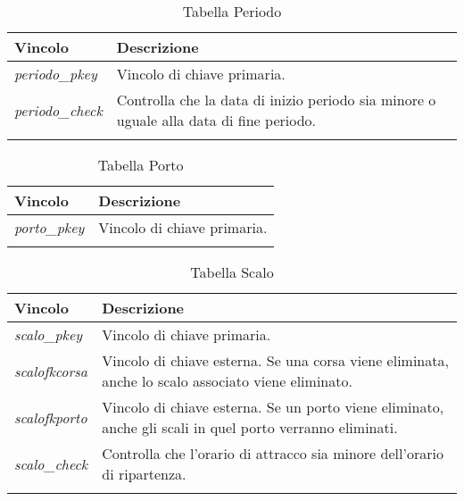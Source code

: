 \begin{longtable}{|| m{} | m{} ||}
    \hline\hline
     \textbf{Vincolo} & \textbf{Descrizione} \\ [1ex]
     \hline\hline
     \endfirsthead

      \textit{periodo\_pkey} & Vincolo di chiave primaria. \\ [1ex]
      \hline

      \textit{periodo\_check} & Controlla che la data di inizio periodo sia minore o uguale alla data di fine periodo. \\ [1ex]      
     \hline\hline

     \caption*{Tabella Periodo} \\
\end{longtable}

\begin{longtable}{|| m{} | m{} ||}
    \hline\hline
     \textbf{Vincolo} & \textbf{Descrizione} \\ [1ex]
     \hline\hline
     \endfirsthead

      \textit{porto\_pkey} & Vincolo di chiave primaria. \\ [1ex]    
     \hline\hline

     \caption*{Tabella Porto} \\
\end{longtable}

\begin{longtable}{|| m{} | m{} ||}
    \hline\hline
     \textbf{Vincolo} & \textbf{Descrizione} \\ [1ex]
     \hline\hline
     \endfirsthead

      \textit{scalo\_pkey} & Vincolo di chiave primaria. \\ [1ex]
      \hline

      \textit{scalofkcorsa} & Vincolo di chiave esterna. Se una corsa viene eliminata, anche lo scalo associato viene eliminato. \\ [1ex]
      \hline

      \textit{scalofkporto} & Vincolo di chiave esterna. Se un porto viene eliminato, anche gli scali in quel porto verranno eliminati. \\ [1ex]
      \hline

      \textit{scalo\_check} & Controlla che l'orario di attracco sia minore dell'orario di ripartenza. \\ [1ex]     
     \hline\hline

     \caption*{Tabella Scalo} \\
\end{longtable}

